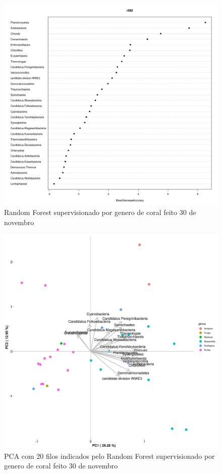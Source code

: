 \documentclass[12pt, a4paper]{report}
\begin{document}
\begin{figure}[H]
\centering
\includegraphics[scale=0.4]{figures/filos/randomforest_supervisionado_genero_corais_mgrast_leticia_2018_10_30.jpeg}
\caption{Random Forest supervisionado por genero de coral feito 30 de novembro}
\label{fig:RandomForestsupervisionadoporgenerodecoral}
\end{figure}

\begin{figure}[H]
\centering
\includegraphics[scale=0.3]{figures/filos/pca_corais_mg_rast_rf_supervisionado_genus_20_filos_30_10_2018.jpg}
\caption{PCA com 20 filos indicados pelo Random Forest supervisionado por genero de coral feito 30 de novembro}
\label{fig:PCAfeitocom20filosrandomForestsupervisionadoporgenerodecoral}
\end{figure}
\end{document}

